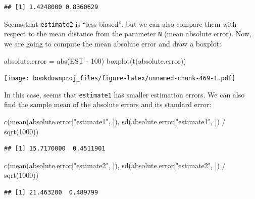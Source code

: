 \documentclass[
]{book}
\newenvironment{Shaded}{\begin{snugshade}}{\end{snugshade}}
\newcommand{\DecValTok}[1]{\textcolor[rgb]{0.00,0.00,0.81}{#1}}
\newcommand{\FunctionTok}[1]{\textcolor[rgb]{0.00,0.00,0.00}{#1}}
\newcommand{\NormalTok}[1]{#1}
\newcommand{\OtherTok}[1]{\textcolor[rgb]{0.56,0.35,0.01}{#1}}
\newcommand{\SpecialCharTok}[1]{\textcolor[rgb]{0.00,0.00,0.00}{#1}}
\newcommand{\StringTok}[1]{\textcolor[rgb]{0.31,0.60,0.02}{#1}}
\theoremstyle{definition}
\theoremstyle{definition}
\theoremstyle{definition}
\theoremstyle{definition}
\theoremstyle{remark}
\begin{document}
\begin{verbatim}
## [1] 1.4248000 0.8360629
\end{verbatim}

Seems that \texttt{estimate2} is ``less biased'', but we can also compare them with respect to the mean distance from the parameter \texttt{N} (mean absolute error). Now, we are going to compute the mean absolute error and draw a boxplot:

\begin{Shaded}
\begin{Highlighting}[]
\NormalTok{absolute.error }\OtherTok{=} \FunctionTok{abs}\NormalTok{(EST }\SpecialCharTok{{-}} \DecValTok{100}\NormalTok{)}
\FunctionTok{boxplot}\NormalTok{(}\FunctionTok{t}\NormalTok{(absolute.error))}
\end{Highlighting}
\end{Shaded}

\texttt{[image: bookdownproj\_files/figure-latex/unnamed-chunk-469-1.pdf]}

In this case, seems that \texttt{estimate1} has smaller estimation errors. We can also find the sample mean of the absolute errors and its standard error:

\begin{Shaded}
\begin{Highlighting}[]
\FunctionTok{c}\NormalTok{(}\FunctionTok{mean}\NormalTok{(absolute.error[}\StringTok{"estimate1"}\NormalTok{, ]), }\FunctionTok{sd}\NormalTok{(absolute.error[}\StringTok{"estimate1"}\NormalTok{, ]) }\SpecialCharTok{/} \FunctionTok{sqrt}\NormalTok{(}\DecValTok{1000}\NormalTok{))}
\end{Highlighting}
\end{Shaded}

\begin{verbatim}
## [1] 15.7170000  0.4511901
\end{verbatim}

\begin{Shaded}
\begin{Highlighting}[]
\FunctionTok{c}\NormalTok{(}\FunctionTok{mean}\NormalTok{(absolute.error[}\StringTok{"estimate2"}\NormalTok{, ]), }\FunctionTok{sd}\NormalTok{(absolute.error[}\StringTok{"estimate2"}\NormalTok{, ]) }\SpecialCharTok{/} \FunctionTok{sqrt}\NormalTok{(}\DecValTok{1000}\NormalTok{))}
\end{Highlighting}
\end{Shaded}

\begin{verbatim}
## [1] 21.463200  0.489799
\end{verbatim}
\end{document}

